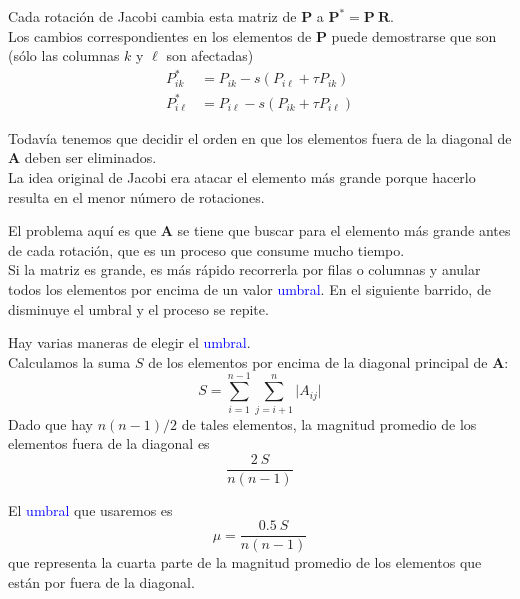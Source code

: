\begin{frame}
Cada rotación de Jacobi cambia esta matriz de $\mathbf{P}$ a $\mathbf{P}^{*} = \mathbf{P \: R}$.
\\
\bigskip
Los cambios correspondientes en los elementos de $\mathbf{P}$ puede demostrarse que son (sólo las columnas $k$ y $\ell$ son afectadas) 
\begin{equation}
\begin{aligned}
P_{i k}^{*} &= P_{i k} - s (P_{i \ell} + \tau P_{i k}) \\
P_{i \ell}^{*} &= P_{i \ell} - s (P_{i k} + \tau P_{i \ell})
\end{aligned}
\label{eq:ecuacion_09_20}
\end{equation}
\end{frame}
\begin{frame}
Todavía tenemos que decidir el orden en que los elementos fuera de la diagonal de $\mathbf{A}$ deben ser eliminados.
\\
\bigskip
La idea original de Jacobi era atacar el elemento más grande porque hacerlo resulta en el menor número de rotaciones.
\end{frame}
\begin{frame}
El problema aquí es que $\mathbf{A}$ se tiene que buscar para el elemento más grande antes de cada rotación, que es un proceso que consume mucho tiempo.
\\
\bigskip
Si la matriz es grande, es más rápido recorrerla por filas o columnas y anular todos los elementos por encima de un valor \textcolor{blue}{umbral}. En el siguiente barrido, de disminuye el umbral y el proceso se repite.
\end{frame}
\begin{frame}
Hay varias maneras de elegir el \textcolor{blue}{umbral}.
\\
\bigskip
Calculamos la suma $S$ de los elementos por encima de la diagonal principal de $\mathbf{A}$:
\begin{equation}
S = \sum_{i = 1}^{n - 1} \sum_{j = i + 1}^{n} \vert A_{i j} \vert
\label{eq:ecuacion_(a)}
\end{equation}
\pause
Dado que hay $n(n - 1)/2$ de tales elementos, la magnitud promedio de los elementos fuera de la diagonal es
\[ \dfrac{2 \: S}{n(n - 1)} \]
\end{frame}
\begin{frame}
El \textcolor{blue}{umbral} que usaremos es
\begin{equation}
\mu = \dfrac{0.5 \: S}{n(n - 1)}
\label{eq:ecuacion_(b)}
\end{equation}
que representa la cuarta parte de la magnitud promedio de los elementos que están por fuera de la diagonal.
\end{frame}
